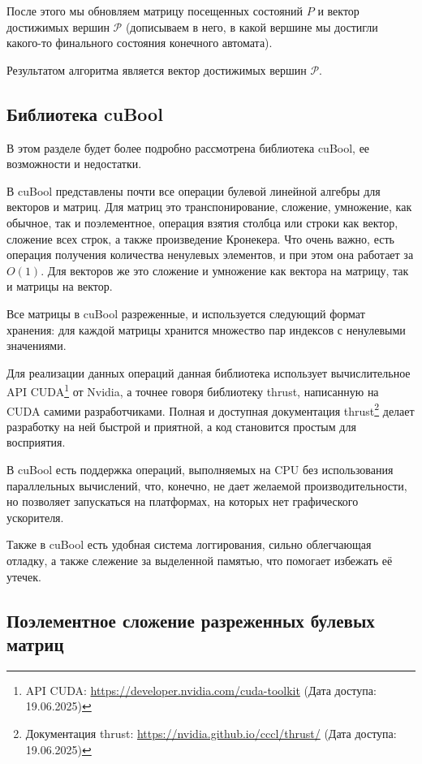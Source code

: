 После этого мы обновляем матрицу посещенных состояний $P$ и вектор достижимых вершин $\mathcal{P}$ (дописываем в него, в какой вершине мы достигли какого-то финального состояния конечного автомата).  

Результатом алгоритма является вектор достижимых вершин $\mathcal{P}$.

\subsection{Библиотека cuBool}
В этом разделе будет более подробно рассмотрена библиотека cuBool, ее возможности и недостатки.

В cuBool представлены почти все операции булевой линейной алгебры для векторов и матриц. Для матриц это транспонирование, сложение, умножение, как обычное, так и поэлементное, операция взятия столбца или строки как вектор, сложение всех строк, а также произведение Кронекера. Что очень важно, есть операция получения количества ненулевых элементов, и при этом она работает за $O(1)$. Для векторов же это сложение и умножение как вектора на матрицу, так и матрицы на вектор.

Все матрицы в cuBool разреженные, и используется следующий формат хранения: для каждой матрицы хранится множество пар индексов с ненулевыми значениями.  

Для реализации данных операций данная библиотека использует вычислительное API CUDA\footnote{API CUDA: \url{https://developer.nvidia.com/cuda-toolkit} (Дата доступа: 19.06.2025)} от Nvidia, а точнее говоря библиотеку thrust, написанную на CUDA самими разработчиками. Полная и доступная документация thrust\footnote{Документация thrust: \url{https://nvidia.github.io/cccl/thrust/} (Дата доступа: 19.06.2025)} делает разработку на ней быстрой и приятной, а код становится простым для восприятия.

В cuBool есть поддержка операций, выполняемых на CPU без использования параллельных вычислений, что, конечно, не дает желаемой производительности, но позволяет запускаться на платформах, на которых нет графического ускорителя.

Также в cuBool есть удобная система логгирования, сильно облегчающая отладку, а также слежение за выделенной памятью, что помогает избежать её утечек.

\subsection{Поэлементное сложение разреженных булевых матриц} \label{MatrixAddSection}

